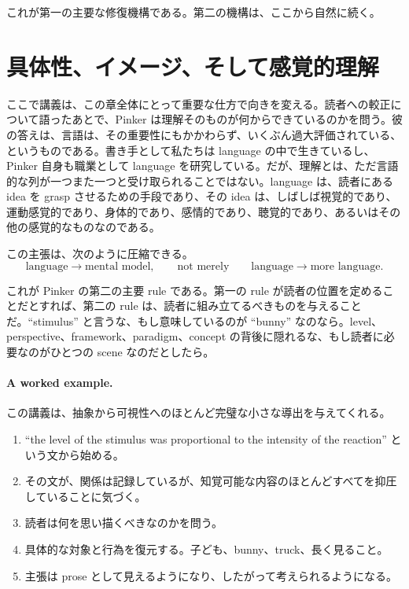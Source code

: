 これが第一の主要な修復機構である。第二の機構は、ここから自然に続く。

\section{具体性、イメージ、そして感覚的理解}

ここで講義は、この章全体にとって重要な仕方で向きを変える。読者への較正について語ったあとで、Pinker は理解そのものが何からできているのかを問う。彼の答えは、言語は、その重要性にもかかわらず、いくぶん過大評価されている、というものである。書き手として私たちは language の中で生きているし、Pinker 自身も職業として language を研究している。だが、理解とは、ただ言語的な列が一つまた一つと受け取られることではない。language は、読者にある idea を grasp させるための手段であり、その idea は、しばしば視覚的であり、運動感覚的であり、身体的であり、感情的であり、聴覚的であり、あるいはその他の感覚的なものなのである。

この主張は、次のように圧縮できる。
\begin{equation}
\text{language} \to \text{mental model},
\qquad
\text{not merely}
\qquad
\text{language} \to \text{more language}.
\end{equation}

これが Pinker の第二の主要 rule である。第一の rule が読者の位置を定めることだとすれば、第二の rule は、読者に組み立てるべきものを与えることだ。``stimulus'' と言うな、もし意味しているのが ``bunny'' なのなら。level、perspective、framework、paradigm、concept の背後に隠れるな、もし読者に必要なのがひとつの scene なのだとしたら。

\paragraph{A worked example.}
この講義は、抽象から可視性へのほとんど完璧な小さな導出を与えてくれる。
\begin{enumerate}
\item ``the level of the stimulus was proportional to the intensity of the reaction'' という文から始める。
\item その文が、関係は記録しているが、知覚可能な内容のほとんどすべてを抑圧していることに気づく。
\item 読者は何を思い描くべきなのかを問う。
\item 具体的な対象と行為を復元する。子ども、bunny、truck、長く見ること。
\item 主張は prose として見えるようになり、したがって考えられるようになる。
\end{enumerate}

